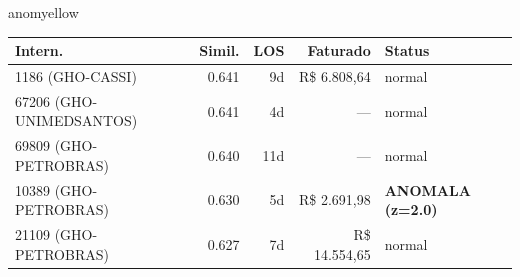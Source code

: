 \documentclass[a4paper,10pt]{article}
\begin{document}
\begin{anomalycard}[Internacao 167580 | GHO-PETROBRAS | MODERADO (z=2.06)]{anomyellow}
\begin{tabular}{l r r r l}\toprule\textbf{Intern.} & \textbf{Simil.} & \textbf{LOS} & \textbf{Faturado} & \textbf{Status} \\\midrule
1186 (GHO-CASSI) & 0.641 & 9d & R\$ 6.808,64 & \textcolor{jcubeblue}{normal} \\
67206 (GHO-UNIMEDSANTOS) & 0.641 & 4d & --- & \textcolor{jcubeblue}{normal} \\
69809 (GHO-PETROBRAS) & 0.640 & 11d & --- & \textcolor{jcubeblue}{normal} \\
10389 (GHO-PETROBRAS) & 0.630 & 5d & R\$ 2.691,98 & \textcolor{anomred}{\textbf{ANOMALA (z=2.0)}} \\
21109 (GHO-PETROBRAS) & 0.627 & 7d & R\$ 14.554,65 & \textcolor{jcubeblue}{normal} \\
\bottomrule\end{tabular}


\end{anomalycard}

\newpage
\end{document}
